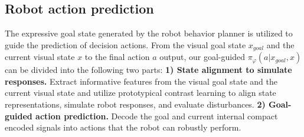 \subsection{Robot action prediction} \label{subsection:Goal-guided action predictor}
The expressive goal state generated by the robot behavior planner is utilized to guide the prediction of decision actions.
From the visual goal state $x_{goal}$ and the current visual state $x$ to the final action $a$ output, our goal-guided $\pi_{\varphi}(a | x_{goal},x)$ can be divided into the following two parts:
\textbf{1) State alignment to simulate responses.} Extract informative features from the visual goal state and the current visual state and utilize prototypical contrast learning to align state representations, simulate robot responses, and evaluate disturbances. 
\textbf{2) Goal-guided action prediction.} Decode the goal and current internal compact encoded signals into actions that the robot can robustly perform.

